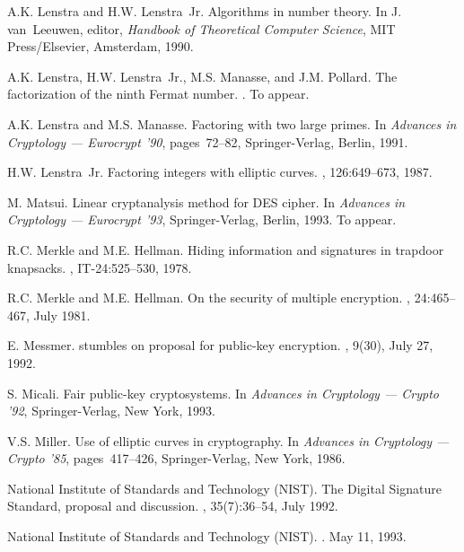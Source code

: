 \begin{thebibliography}{10}
A.K. Lenstra and H.W. Lenstra~Jr.
\newblock Algorithms in number theory.
\newblock In J. van~Leeuwen, editor, {\it Handbook of Theoretical Computer
  Science}, MIT Press/Elsevier, Amsterdam, 1990.

A.K. Lenstra, H.W. Lenstra~Jr., M.S. Manasse, and J.M. Pollard.
\newblock The factorization of the ninth {Fermat} number.
.
\newblock To appear.

A.K. Lenstra and M.S. Manasse.
\newblock Factoring with two large primes.
\newblock In {\it Advances in Cryptology --- Eurocrypt '90}, pages~72--82,
  Springer-Verlag, Berlin, 1991.

H.W. Lenstra~Jr.
\newblock Factoring integers with elliptic curves.
, 126:649--673, 1987.

M. Matsui.
\newblock Linear cryptanalysis method for {DES} cipher.
\newblock In {\it Advances in Cryptology --- Eurocrypt '93}, Springer-Verlag,
  Berlin, 1993.
\newblock To appear.

R.C. Merkle and M.E. Hellman.
\newblock Hiding information and signatures in trapdoor knapsacks.
, IT-24:525--530, 1978.

R.C. Merkle and M.E. Hellman.
\newblock On the security of multiple encryption.
, 24:465--467, July 1981.

E. Messmer.
 stumbles on proposal for public-key encryption.
, 9(30), July 27, 1992.

S. Micali.
\newblock Fair public-key cryptosystems.
\newblock In {\it Advances in Cryptology --- Crypto '92}, Springer-Verlag, New
  York, 1993.

V.S. Miller.
\newblock Use of elliptic curves in cryptography.
\newblock In {\it Advances in Cryptology --- Crypto '85}, pages~417--426,
  Springer-Verlag, New York, 1986.

{National Institute of Standards and Technology (NIST)}.
\newblock The {Digital Signature Standard}, proposal and discussion.
, 35(7):36--54, July 1992.

{National Institute of Standards and Technology (NIST)}.
.
\newblock May 11, 1993.


\end{thebibliography}

